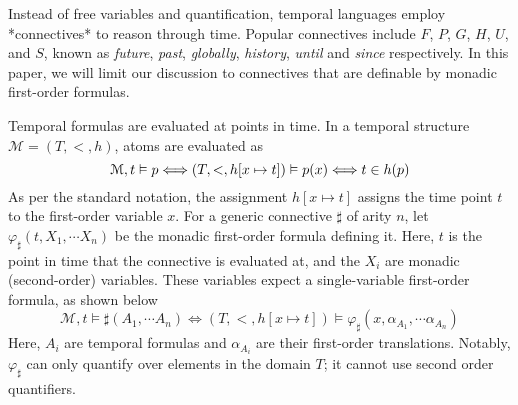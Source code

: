 \documentclass[a4paper,UKenglish,cleveref, autoref, thm-restate]{lipics-v2021}
\begin{document}
Instead of free variables and quantification, temporal languages employ *connectives* to reason through time. Popular connectives include $F$, $P$, $G$, $H$, $U$, and $S$, known as \textit{future}, \textit{past}, \textit{globally}, \textit{history}, \textit{until} and \textit{since} respectively. In this paper, we will limit our discussion to connectives that are definable by monadic first-order formulas.

Temporal formulas are evaluated at points in time. In a temporal structure $\mathcal{M} = (T, <, h)$, atoms are evaluated as
\begin{equation*}
    \mathcal{M}, t \vDash p \Longleftrightarrow (T, <, h[x \mapsto t]) \vDash p(x) \Longleftrightarrow t \in h(p)\\
\end{equation*}
As per the standard notation, the assignment $h[x \mapsto t]$ assigns the time point $t$ to the first-order variable $x$. For a generic connective $\sharp$ of arity $n$, let $\varphi_\sharp(t, X_1, \cdots X_n)$ be the monadic first-order formula defining it. Here, $t$ is the point in time that the connective is evaluated at, and the $X_i$ are monadic (second-order) variables. These variables expect a single-variable first-order formula, as shown below
\begin{equation*}
    \mathcal{M}, t \vDash \sharp(A_1, \cdots A_n) \Longleftrightarrow (T, <, h[x \mapsto t]) \vDash \varphi_\sharp(x, \alpha_{A_1}, \cdots \alpha_{A_n})
\end{equation*}
Here, $A_i$ are temporal formulas and $\alpha_{A_i}$ are their first-order translations. Notably, $\varphi_\sharp$ can only quantify over elements in the domain $T$; it cannot use second order quantifiers.
\end{document}
